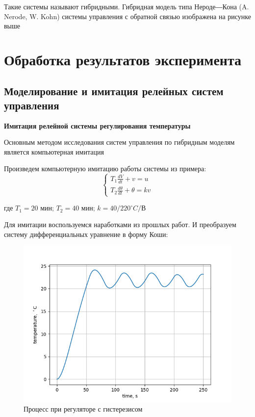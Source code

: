 Такие системы называют гибридными. Гибридная модель типа Нероде―Кона (A. Nerode, W. Kohn) системы управления с обратной связью изображена на рисунке выше

\newpage

\section{Обработка результатов эксперимента}

\subsection{Моделирование и имитация релейных систем управления}

\textbf{Имитация релейной системы регулирования температуры}

Основным методом исследования систем управления по гибридным моделям является компьютерная имитация

Произведем компьютерную имитацию работы системы из примера:
$$
\begin{cases}
	T_1 \frac{dV}{dt} + v = u \\
	T_2 \frac{d\theta}{dt} + \theta = kv
\end{cases}
$$

где $T_1 = 20$  мин; $T_2 = 40$ мин;  $k = 40/220 ^{\circ}C/$В

Для имитации воспользуемся наработками из прошлых работ. И преобразуем систему дифференциальных уравнение в форму Коши:

\begin{figure}[H]
	\centering
	\includegraphics[width=1\linewidth]{body/images/default-system.png}
	\caption{Процесс при регуляторе с гистерезисом}
	\label{fig:1}
\end{figure}

